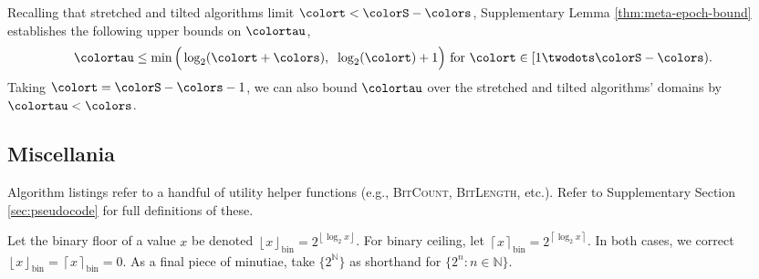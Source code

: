 Recalling that stretched and tilted algorithms limit $\colort < \colorS - \colors$, Supplementary Lemma \ref{thm:meta-epoch-bound} establishes the following upper bounds on $\colortau$,
\begin{align*}
\colortau
&\leq
\min\Big(
  \log_2(\colort + \colors),\;\;
  \log_2(\colort) + 1
\Big)
\text{ for } \colort \in [1 \twodots \colorS - \colors).
\end{align*}
Taking $\colort = \colorS - \colors - 1$, we can also bound $\colortau$ over the stretched and tilted algorithms' domains by $\colortau < \colors$.

\subsection{Miscellania}

Algorithm listings refer to a handful of utility helper functions (e.g., \textsc{BitCount}, \textsc{BitLength}, etc.).
Refer to Supplementary Section \ref{sec:pseudocode} for full definitions of these.

Let the binary floor of a value $x$ be denoted $\left\lfloor x \right\rfloor_\mathrm{bin} = 2^{\left\lfloor \log_2 x \right\rfloor}$.
For binary ceiling, let $\left\lceil x \right\rceil_\mathrm{bin} = 2^{\left\lceil \log_2 x \right\rceil}$.
In both cases, we correct $\left\lfloor x \right\rfloor_\mathrm{bin} = \left\lceil x \right\rceil_\mathrm{bin} = 0$.
As a final piece of minutiae, take $\{2^{\mathbb{N}}\}$ as shorthand for $\{2^n : n \in \mathbb{N} \}$.

